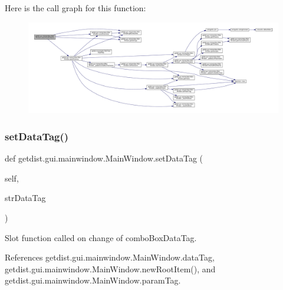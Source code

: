 Here is the call graph for this function\+:
\nopagebreak
\begin{figure}[H]
\begin{center}
\leavevmode
\includegraphics[width=350pt]{classgetdist_1_1gui_1_1mainwindow_1_1MainWindow_a1f82d42630833ea1995e22bc60148d27_cgraph}
\end{center}
\end{figure}
\mbox{\label{classgetdist_1_1gui_1_1mainwindow_1_1MainWindow_a8245458267a1ec89415f146dec08a2ef}} 
\subsubsection{\texorpdfstring{set\+Data\+Tag()}{setDataTag()}}
{\footnotesize\ttfamily def getdist.\+gui.\+mainwindow.\+Main\+Window.\+set\+Data\+Tag (\begin{DoxyParamCaption}\item[{}]{self,  }\item[{}]{str\+Data\+Tag }\end{DoxyParamCaption})}

\begin{DoxyVerb}Slot function called on change of comboBoxDataTag.
\end{DoxyVerb}
 

References getdist.\+gui.\+mainwindow.\+Main\+Window.\+data\+Tag, getdist.\+gui.\+mainwindow.\+Main\+Window.\+new\+Root\+Item(), and getdist.\+gui.\+mainwindow.\+Main\+Window.\+param\+Tag.

